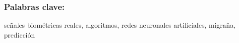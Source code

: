
\thispagestyle{empty}  









\vspace*{0.5cm} 
 
\subsubsection*{Palabras  clave:}  señales  biométricas reales, algoritmos, redes neuronales artificiales, migraña, predicción

